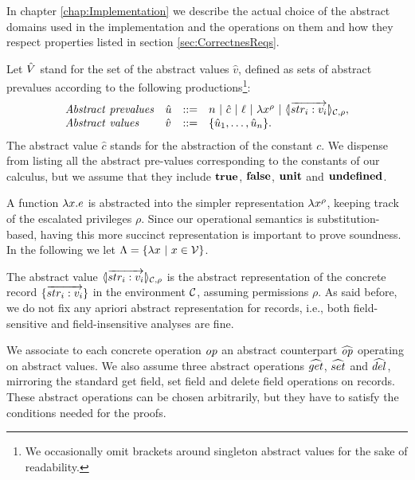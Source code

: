 In chapter \ref{chap:Implementation} we describe the actual choice of the abstract domains used in the implementation and the operations on them and how they respect properties listed in section \ref{sec:CorrectnesReqs}.


Let $\hat{V}$ stand for the set of the abstract values $\hat{v}$,
defined as sets of abstract prevalues according to the following 
productions\footnote{We occasionally omit brackets around singleton 
abstract values for the sake of readability.}:
\[
\begin{array}{llcl}
\mathit{Abstract\ prevalues} & \hat{u} & ::= & n ~|~ \hat{c} ~|~ \ell ~|~ \lambda x^{\rho} ~|~ \langle\!| \overrightarrow{str_i: v_i} |\!\rangle_{{\cal C},\rho}, \\
\mathit{Abstract\ values} & \hat{v} & ::= & \{\hat{u}_1,\ldots,\hat{u}_n\}.
\end{array}
\]
The abstract value $\hat{c}$ stands for the abstraction of the constant $c$.
We dispense from listing all the abstract pre-values corresponding to 
the constants of our calculus, but we assume that they include $\mathbf{true}$, 
$\mathbf{false}$, $\mathbf{unit}$ and $\mathbf{undefined}$.

A function $\lambda x.e$ is abstracted into the simpler representation
$\lambda x^{\rho}$, keeping track of the escalated privileges $\rho$. Since 
our operational semantics is substitution-based, having this more succinct
representation is important to prove soundness. In the following we let 
$\Lambda = \{\lambda x ~|~ x \in \mathcal{V}\}$.

The abstract value $\langle\!| \overrightarrow{str_i: v_i} |\!\rangle_{{\cal C},\rho}$ is the abstract representation
of the concrete record $\{\overrightarrow{str_i: v_i}\}$ in the environment ${\cal C}$, assuming
permissions $\rho$. As said before, we do not fix any apriori abstract representation
for records, i.e., both field-sensitive and field-insensitive analyses are fine.

We associate to each concrete operation $\mathit{op}$ an abstract counterpart $\widehat{\mathit{op}}$
operating on abstract values. We also assume three abstract operations $\widehat{get}$,
$\widehat{set}$ and $\widehat{del}$, mirroring the standard get field, set field and delete
field operations on records. These abstract operations can be chosen arbitrarily,
but they have to satisfy the conditions needed for the proofs. 


